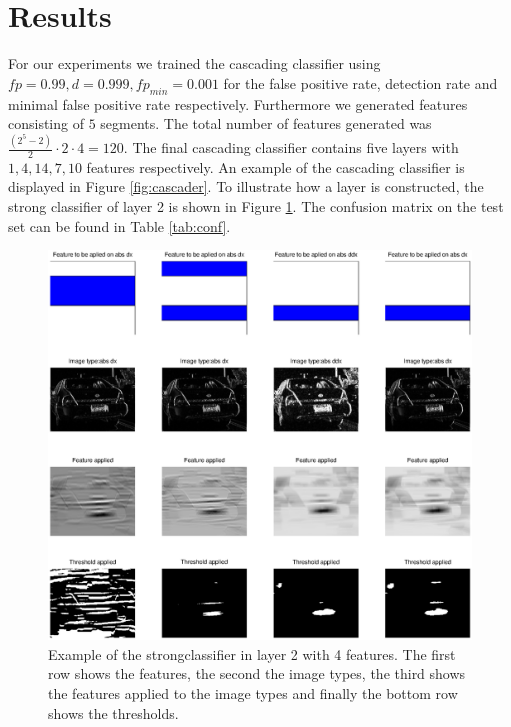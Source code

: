 \documentclass[a4paper,11pt]{article}
\begin{document}
\section{Results} \label{sec:res}
For our experiments we trained the cascading classifier using $fp = 0.99, d =
0.999, fp_{min} = 0.001$ for the false positive rate, detection rate and
minimal false positive rate respectively. Furthermore we generated features
consisting of $5$ segments. The total number of features generated was
$\frac{(2^5-2)}{2}\cdot 2 \cdot 4 = 120$. The final cascading classifier
contains five layers with $1, 4, 14, 7, 10$ features respectively. An example
of the cascading classifier is displayed in Figure \ref{fig:cascader}. To
illustrate how a layer is constructed, the strong classifier of layer 2 is
shown in Figure \ref{fig:strongclassify}. The confusion matrix on the test set
can be found in Table \ref{tab:conf}. 

\begin{figure}[!ht]
\centering
\includegraphics[width=16cm]{img/strongClassifier_layer2_img14}
\caption{Example of the strongclassifier in layer 2 with 4 features. The first
row shows the features, the second the image types, the third shows the
features applied to the image types and finally the bottom row shows the
thresholds.}
\label{fig:strongclassify}
\end{figure}
\end{document}
